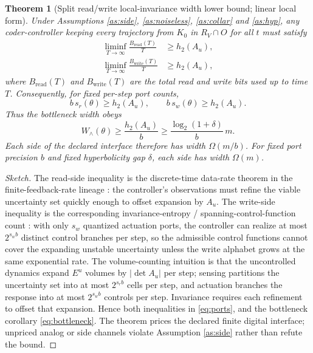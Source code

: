 \documentclass[11pt]{article}
\newtheorem{theorem}{Theorem}[section]
\theoremstyle{definition}
\theoremstyle{remark}
\newcommand{\RV}{R_V}
\newcommand{\Eu}{E^u}
\newcommand{\Au}{A_u}
\newcommand{\htwo}{h_2}
\newcommand{\W}{W}
\newcommand{\sr}{s_r}
\newcommand{\sw}{s_w}
\begin{document}
\begin{theorem}[Split read/write local-invariance width lower bound; linear local form]\label{thm:main}
Under Assumptions \ref{as:side}, \ref{as:noiseless}, \ref{as:collar} and \ref{as:hyp}, any coder-controller keeping every trajectory from $K_0$ in $\RV\cap O$ for all $t$ must satisfy
\begin{align}
\liminf_{T\to\infty}\frac{B_{\mathrm{read}}(T)}{T}&\ge\htwo(\Au), \label{eq:read}\\
\liminf_{T\to\infty}\frac{B_{\mathrm{write}}(T)}{T}&\ge\htwo(\Au), \label{eq:write}
\end{align}
where $B_{\mathrm{read}}(T)$ and $B_{\mathrm{write}}(T)$ are the total read and write bits used up to time $T$. Consequently, for fixed per-step port counts,
\begin{equation}
b\,\sr(\theta)\ge\htwo(\Au),\qquad b\,\sw(\theta)\ge\htwo(\Au). \label{eq:ports}
\end{equation}
Thus the bottleneck width obeys
\begin{equation}
\W_\wedge(\theta)\ge\frac{\htwo(\Au)}{b}\ge\frac{\log_2(1+\delta)}{b}\,m. \label{eq:bottleneck}
\end{equation}
Each side of the declared interface therefore has width $\Omega(m/b)$. For fixed port precision $b$ and fixed hyperbolicity gap $\delta$, each side has width $\Omega(m)$.
\end{theorem}
\begin{proof}[Sketch]
The read-side inequality is the discrete-time data-rate theorem in the finite-feedback-rate lineage \cite{nair2000}: the controller's observations must refine the viable uncertainty set quickly enough to offset expansion by $\Au$. The write-side inequality is the corresponding invariance-entropy / spanning-control-function count \cite{colonius2009,kawan2013}: with only $\sw$ quantized actuation ports, the controller can realize at most $2^{\sw b}$ distinct control branches per step, so the admissible control functions cannot cover the expanding unstable uncertainty unless the write alphabet grows at the same exponential rate. The volume-counting intuition is that the uncontrolled dynamics expand $\Eu$ volumes by $|\det\Au|$ per step; sensing partitions the uncertainty set into at most $2^{\sr b}$ cells per step, and actuation branches the response into at most $2^{\sw b}$ controls per step. Invariance requires each refinement to offset that expansion. Hence both inequalities in \eqref{eq:ports}, and the bottleneck corollary \eqref{eq:bottleneck}. The theorem prices the declared finite digital interface; unpriced analog or side channels violate Assumption \ref{as:side} rather than refute the bound.
\end{proof}
\end{document}
